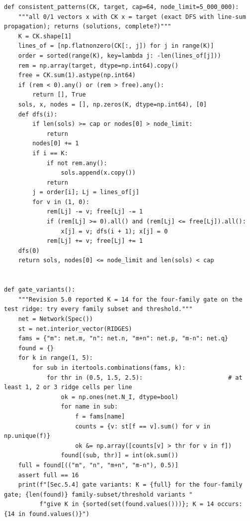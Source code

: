 \documentclass[11pt,a4paper]{article}
\theoremstyle{definition}
\theoremstyle{remark}
\begin{document}
\begin{lstlisting}
def consistent_patterns(CK, target, cap=64, node_limit=5_000_000):
    """all 0/1 vectors x with CK x = target (exact DFS with line-sum propagation); returns (solutions, complete?)"""
    K = CK.shape[1]
    lines_of = [np.flatnonzero(CK[:, j]) for j in range(K)]
    order = sorted(range(K), key=lambda j: -len(lines_of[j]))
    rem = np.array(target, dtype=np.int64).copy()
    free = CK.sum(1).astype(np.int64)
    if (rem < 0).any() or (rem > free).any():
        return [], True
    sols, x, nodes = [], np.zeros(K, dtype=np.int64), [0]
    def dfs(i):
        if len(sols) >= cap or nodes[0] > node_limit:
            return
        nodes[0] += 1
        if i == K:
            if not rem.any():
                sols.append(x.copy())
            return
        j = order[i]; Lj = lines_of[j]
        for v in (1, 0):
            rem[Lj] -= v; free[Lj] -= 1
            if (rem[Lj] >= 0).all() and (rem[Lj] <= free[Lj]).all():
                x[j] = v; dfs(i + 1); x[j] = 0
            rem[Lj] += v; free[Lj] += 1
    dfs(0)
    return sols, nodes[0] <= node_limit and len(sols) < cap


def gate_variants():
    """Revision 5.0 reported K = 14 for the four-family gate on the test ridge: try every family subset and threshold."""
    net = Network(Spec())
    st = net.interior_vector(RIDGES)
    fams = {"m": net.m, "n": net.n, "m+n": net.p, "m-n": net.q}
    found = {}
    for k in range(1, 5):
        for sub in itertools.combinations(fams, k):
            for thr in (0.5, 1.5, 2.5):                        # at least 1, 2 or 3 ridge cells per line
                ok = np.ones(net.N_I, dtype=bool)
                for name in sub:
                    f = fams[name]
                    counts = {v: st[f == v].sum() for v in np.unique(f)}
                    ok &= np.array([counts[v] > thr for v in f])
                found[(sub, thr)] = int(ok.sum())
    full = found[(("m", "n", "m+n", "m-n"), 0.5)]
    assert full == 16
    print(f"[Sec.5.4] gate variants: K = {full} for the four-family gate; {len(found)} family-subset/threshold variants "
          f"give K in {sorted(set(found.values()))}; K = 14 occurs: {14 in found.values()}")



\end{lstlisting}
\end{document}
